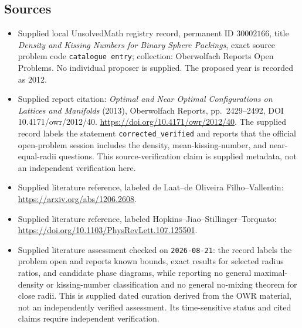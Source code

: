 \documentclass[11pt]{article}
\begin{document}
\subsection{Sources}
\begin{itemize}
\item Supplied local UnsolvedMath registry record, permanent ID \(30002166\), title \emph{Density and Kissing Numbers for Binary Sphere Packings}, exact source problem code \texttt{catalogue entry}; collection: Oberwolfach Reports Open Problems. No individual proposer is supplied. The proposed year is recorded as 2012.
\item Supplied report citation: \emph{Optimal and Near Optimal Configurations on Lattices and Manifolds} (2013), Oberwolfach Reports, pp.\ 2429--2492, DOI 10.4171/owr/2012/40. \url{https://doi.org/10.4171/owr/2012/40}. The supplied record labels the statement \texttt{corrected\_verified} and reports that the official open-problem session includes the density, mean-kissing-number, and near-equal-radii questions. This source-verification claim is supplied metadata, not an independent verification here.
\item Supplied literature reference, labeled de Laat--de Oliveira Filho--Vallentin: \url{https://arxiv.org/abs/1206.2608}.
\item Supplied literature reference, labeled Hopkins--Jiao--Stillinger--Torquato: \url{https://doi.org/10.1103/PhysRevLett.107.125501}.
\item Supplied literature assessment checked on \texttt{2026-08-21}: the record labels the problem open and reports known bounds, exact results for selected radius ratios, and candidate phase diagrams, while reporting no general maximal-density or kissing-number classification and no general no-mixing theorem for close radii. This is supplied dated curation derived from the OWR material, not an independently verified assessment. Its time-sensitive status and cited claims require independent verification.
\end{itemize}
\end{document}
